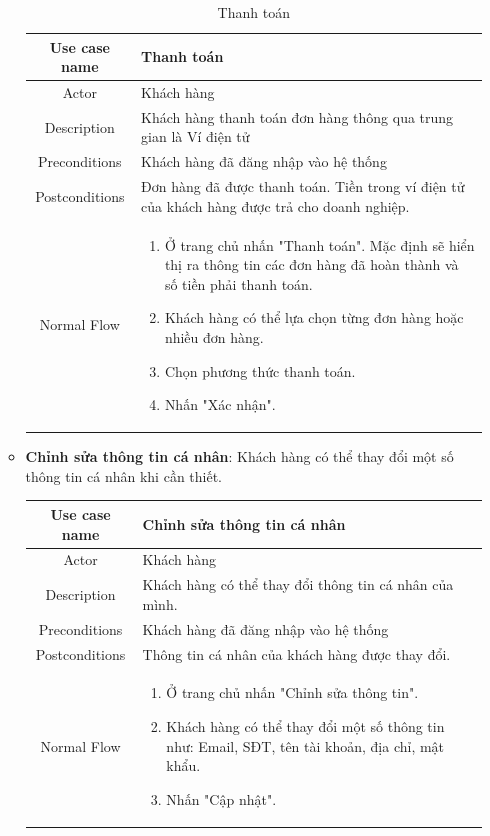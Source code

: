\begin{itemize}
\begin{itemize}
			\begin{table}[H]
				\centering\begin{tabular}{|c|m{25em}|}
					\hline 
					Use case name & Thanh toán\\ 
					\hline 
					Actor & Khách hàng \\ 
					\hline
					Description & Khách hàng thanh toán đơn hàng thông qua trung gian là Ví điện tử \\
					\hline 
					Preconditions & Khách hàng đã đăng nhập vào hệ thống \\
					\hline
					Postconditions & Đơn hàng đã được thanh toán. Tiền trong ví điện tử của khách hàng được trả cho doanh nghiệp. \\
					\hline
					Normal Flow & \begin{enumerate}
						\item Ở trang chủ nhấn "Thanh toán". Mặc định sẽ hiển thị ra thông tin các đơn hàng đã hoàn thành và số tiền phải thanh toán.
						\item Khách hàng có thể lựa chọn từng đơn hàng hoặc nhiều đơn hàng.
						\item Chọn phương thức thanh toán.
						\item Nhấn "Xác nhận".
						
					\end{enumerate}
					\\
					\hline
				\end{tabular}
				\caption{Thanh toán}
			\end{table}
		
			\item \textbf{Chỉnh sửa thông tin cá nhân}: Khách hàng có thể thay đổi một số thông tin cá nhân khi cần thiết.
			
				\begin{table}[H]
					\centering\begin{tabular}{|c|m{25em}|}
						\hline 
						Use case name & Chỉnh sửa thông tin cá nhân\\ 
						\hline 
						Actor & Khách hàng \\ 
						\hline
						Description & Khách hàng có thể thay đổi thông tin cá nhân của mình. \\
						\hline 
						Preconditions & Khách hàng đã đăng nhập vào hệ thống \\
						\hline
						Postconditions & Thông tin cá nhân của khách hàng được thay đổi. \\
						\hline
						Normal Flow & \begin{enumerate}
							\item Ở trang chủ nhấn "Chỉnh sửa thông tin".
							\item Khách hàng có thể thay đổi một số thông tin như: Email, SĐT, tên tài khoản, địa chỉ, mật khẩu.
							\item Nhấn "Cập nhật".
							

\end{enumerate}
\end{tabular}
\end{table}
\end{itemize}
\end{itemize}
